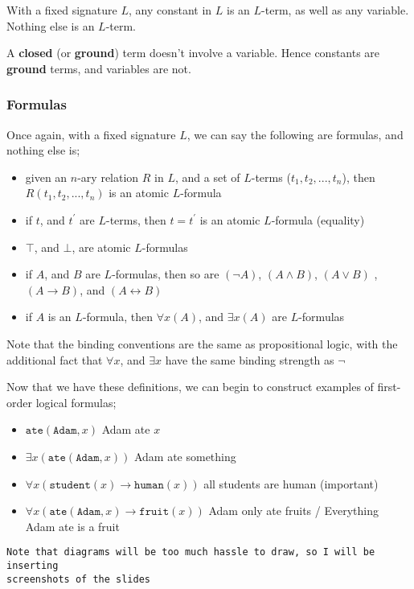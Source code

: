 \documentclass[a4paper, 12pt]{article}
\begin{document}
        With a fixed signature $L$, any constant in $L$ is an $L$-term, as well as any variable. Nothing else is an $L$-term.
        \smallskip

        A \textbf{closed} (or \textbf{ground}) term doesn't involve a variable. Hence constants are \textbf{ground} terms, and variables are not.

        \subsubsection*{Formulas}
        Once again, with a fixed signature $L$, we can say the following are formulas, and nothing else is;
        \begin{itemize}
            \item given an $n$-ary relation $R$ in $L$, and a set of $L$-terms ($t_1, t_2, ..., t_n$), then $R(t_1, t_2, ..., t_n)$ is an atomic $L$-formula
            \item if $t$, and $t^\prime$ are $L$-terms, then $t = t^\prime$ is an atomic $L$-formula (equality)
            \item $\top$, and $\bot$, are atomic $L$-formulas
            \item if $A$, and $B$ are $L$-formulas, then so are $(\neg A)$, $(A \land B)$, $(A \lor B)$ , $(A \rightarrow B)$, and $(A \leftrightarrow B)$
            \item if $A$ is an $L$-formula, then $\forall x (A)$, and $\exists x (A)$ are $L$-formulas
        \end{itemize}
        Note that the binding conventions are the same as propositional logic, with the additional fact that $\forall x$, and $\exists x$ have the same binding strength as $\neg$
        \medskip

        Now that we have these definitions, we can begin to construct examples of first-order logical formulas;
        \begin{itemize}
            \item $\texttt{ate}(\texttt{Adam}, x)$ \hfill Adam ate $x$
            \item $\exists x (\texttt{ate}(\texttt{Adam}, x))$ \hfill Adam ate something
            \item $\forall x (\texttt{student}(x) \rightarrow \texttt{human}(x))$ \hfill all students are human (important)
            \item $\forall x (\texttt{ate}(\texttt{Adam}, x) \rightarrow \texttt{fruit}(x))$ \hfill Adam only ate fruits / Everything Adam ate is a fruit
        \end{itemize}

        \texttt{Note that diagrams will be too much hassle to draw, so I will be inserting \\ screenshots of the slides}
    
\end{document}
